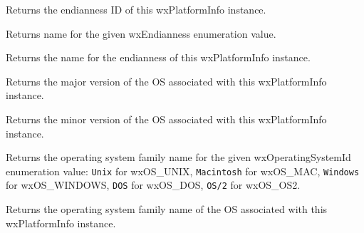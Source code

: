 Returns the endianness ID of this wxPlatformInfo instance.

\label{wxplatforminfogetendiannessname}


Returns name for the given wxEndianness enumeration value.


Returns the name for the endianness of this wxPlatformInfo instance.





\label{wxplatforminfogetosmajorversion}


Returns the major version of the OS associated with this wxPlatformInfo instance.




\label{wxplatforminfogetosminorversion}


Returns the minor version of the OS associated with this wxPlatformInfo instance.




\label{wxplatforminfogetoperatingsystemfamilyname}


Returns the operating system family name for the given wxOperatingSystemId enumeration value:
{\tt Unix} for wxOS\_UNIX, {\tt Macintosh} for wxOS\_MAC, {\tt Windows} for wxOS\_WINDOWS,
{\tt DOS} for wxOS\_DOS, {\tt OS/2} for wxOS\_OS2.


Returns the operating system family name of the OS associated with this wxPlatformInfo instance.



\label{wxplatforminfogetoperatingsystemid}

